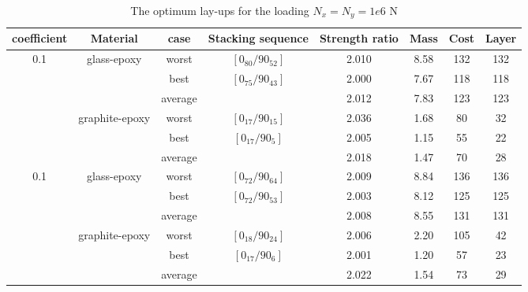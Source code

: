 \begin{table*}[!htb]
\caption{The optimum lay-ups for the loading $N_x=N_y=1e6$ N}
\centering
\begin{adjustbox}{width=1\textwidth}
	\begin{tabular}{cccccccc}
	\toprule
	coefficient		     &	 Material		               	 & case     & Stacking sequence    & Strength ratio  & Mass  &  Cost   & Layer    \\ 
	\midrule																															  
	\multirow{6}{*}{0.1} &	\multirow{3}{*}{glass-epoxy}   	 & worst     &  $[0_{80}/90_{52}]$ & 2.010           &  8.58  & 132     & 132   \\
						 &								     & best      &  $[0_{75}/90_{43}]$ & 2.000           &  7.67  & 118     & 118  \\
					     &									 & average   &    		           & 2.012           &  7.83  & 123     & 123  \\
						 &	\multirow{3}{*}{graphite-epoxy}	 & worst     &  $[0_{17}/90_{15}]$ & 2.036           & 1.68   & 80      & 32      \\
					     &								     & best      &  $[0_{17}/90_{5}]$  & 2.005           & 1.15   & 55      & 22      \\
					     &								     & average   &                     & 2.018           & 1.47   & 70      & 28      \\
	\multirow{6}{*}{0.1} &	\multirow{3}{*}{glass-epoxy}   	 & worst     &  $[0_{72}/90_{64}]$ &  2.009          & 8.84   &  136    &  136   \\
						 &								     & best      &  $[0_{72}/90_{53}]$ &  2.003          & 8.12   &  125    &  125   \\
					     &									 & average   &                     &  2.008          & 8.55   &  131    &  131  \\
						 &	\multirow{3}{*}{graphite-epoxy}	 & worst     &  $[0_{18}/90_{24}]$ &  2.006          & 2.20   &  105    &  42  \\
					     &								     & best      &  $[0_{17}/90_{6}]$  &  2.001          & 1.20   &  57     &  23  \\
					     &								     & average   &                    &   2.022          & 1.54   &  73     &  29  \\
\end{tabular}
\end{adjustbox}
\label{tab:NxNy}
\end{table*}
            
            
